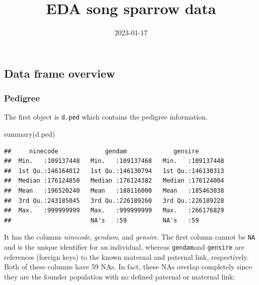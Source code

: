 \documentclass[
]{article}
\title{EDA song sparrow data}
\author{}
\date{\vspace{-2.5em}2023-01-17}
\newenvironment{Shaded}{\begin{snugshade}}{\end{snugshade}}
\newcommand{\FunctionTok}[1]{\textcolor[rgb]{0.00,0.00,0.00}{#1}}
\newcommand{\NormalTok}[1]{#1}
\newcommand{\SpecialCharTok}[1]{\textcolor[rgb]{0.00,0.00,0.00}{#1}}
\newcommand{\StringTok}[1]{\textcolor[rgb]{0.31,0.60,0.02}{#1}}
\begin{document}
\maketitle

\hypertarget{data-frame-overview}{%
\subsection*{Data frame overview}\label{data-frame-overview}}

\hypertarget{pedigree}{%
\subsubsection*{Pedigree}\label{pedigree}}

The first object is \texttt{d.ped} which contains the pedigree
information.

\begin{Shaded}
\begin{Highlighting}[]
\FunctionTok{summary}\NormalTok{(d.ped)}
\end{Highlighting}
\end{Shaded}

\begin{verbatim}
##     ninecode             gendam             gensire         
##  Min.   :109137448   Min.   :109137468   Min.   :109137448  
##  1st Qu.:146164012   1st Qu.:146130794   1st Qu.:146130313  
##  Median :176124850   Median :176124382   Median :176124004  
##  Mean   :196520240   Mean   :188116000   Mean   :185463038  
##  3rd Qu.:243185045   3rd Qu.:226189260   3rd Qu.:226189228  
##  Max.   :999999999   Max.   :999999999   Max.   :266176829  
##                      NA's   :59          NA's   :59
\end{verbatim}

It has the columns \emph{ninecode}, \emph{gendam}, and \emph{gensire}.
The first column cannot be \texttt{NA} and is the unique identifier for
an individual, whereas \texttt{gendam}and \texttt{gensire} are
references (foreign keys) to the known maternal and paternal link,
respectively. Both of these columns have 59 NAs. In fact, these NAs
overlap completely since they are the founder population with no defined
paternal or maternal link:

\begin{Shaded}
\end{Shaded}
\end{document}
